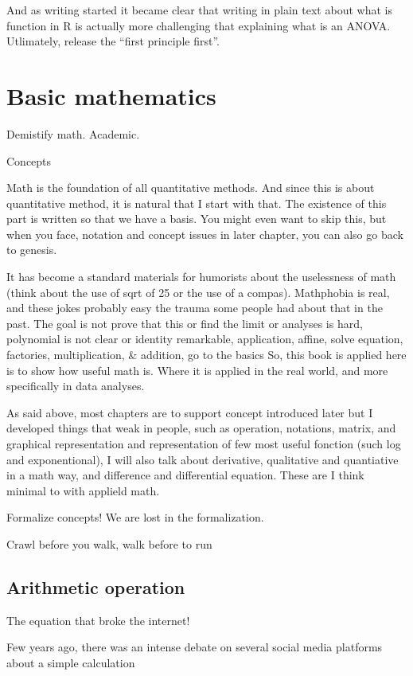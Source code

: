 \documentclass[
  letterpaper,
  DIV=11,
  numbers=noendperiod]{scrreprt}
\begin{document}
And as writing started it became clear that writing in plain text about
what is function in R is actually more challenging that explaining what
is an ANOVA. Utlimately, release the ``first principle first''.

\part{Basic mathematics}

Demistify math. Academic.

Concepts

Math is the foundation of all quantitative methods. And since this is
about quantitative method, it is natural that I start with that. The
existence of this part is written so that we have a basis. You might
even want to skip this, but when you face, notation and concept issues
in later chapter, you can also go back to genesis.

It has become a standard materials for humorists about the uselessness
of math (think about the use of sqrt of 25 or the use of a compas).
Mathphobia is real, and these jokes probably easy the trauma some people
had about that in the past. The goal is not prove that this or find the
limit or analyses is hard, polynomial is not clear or identity
remarkable, application, affine, solve equation, factories,
multiplication, \& addition, go to the basics So, this book is applied
here is to show how useful math is. Where it is applied in the real
world, and more specifically in data analyses.

As said above, most chapters are to support concept introduced later but
I developed things that weak in people, such as operation, notations,
matrix, and graphical representation and representation of few most
useful fonction (such log and exponentional), I will also talk about
derivative, qualitative and quantiative in a math way, and difference
and differential equation. These are I think minimal to with applield
math.

Formalize concepts! We are lost in the formalization.

Crawl before you walk, walk before to run

\chapter{Arithmetic operation}\label{sec-arithmeticMath}

The equation that broke the internet!

Few years ago, there was an intense debate on several social media
platforms about a simple calculation
\end{document}
